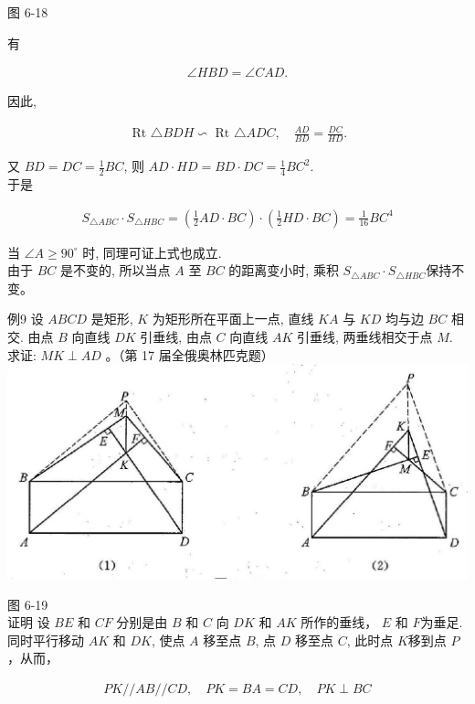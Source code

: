 \documentclass[10pt]{article}
\begin{document}
图 6-18

有

\begin{align*}
\angle H B D=\angle C A D .
\end{align*}

因此,

\begin{align*}
\text { Rt } \triangle B D H \backsim \text { Rt } \triangle A D C, \quad \frac{A D}{B D}=\frac{D C}{H D} .
\end{align*}

又 $B D=D C=\frac{1}{2} B C$, 则 $A D \cdot H D=B D \cdot D C=\frac{1}{4} B C^{2}$.\\
于是

\begin{align*}
S_{\triangle A B C} \cdot S_{\triangle H B C}=\left(\frac{1}{2} A D \cdot B C\right) \cdot\left(\frac{1}{2} H D \cdot B C\right)=\frac{1}{16} B C^{4}
\end{align*}

当 $\angle A \geqslant 90^{\circ}$ 时, 同理可证上式也成立.\\
由于 $B C$ 是不变的, 所以当点 $A$ 至 $B C$ 的距离变小时, 乘积 $S_{\triangle A B C} \cdot S_{\triangle H B C}$保持不变。

例9 设 $A B C D$ 是矩形, $K$ 为矩形所在平面上一点, 直线 $K A$ 与 $K D$ 均与边 $B C$ 相交. 由点 $B$ 向直线 $D K$ 引垂线, 由点 $C$ 向直线 $A K$ 引垂线, 两垂线相交于点 $M$. 求证: $M K \perp A D$ 。（第 17 届全俄奥林匹克题）\\
\includegraphics[max width=\textwidth, center]{2024_10_30_2c8f45efd4a519b08e1ag-070(1)}

图 6-19\\
证明 设 $B E$ 和 $C F$ 分别是由 $B$ 和 $C$ 向 $D K$ 和 $A K$ 所作的垂线， $E$ 和 $F$为垂足. 同时平行移动 $A K$ 和 $D K$, 使点 $A$ 移至点 $B$, 点 $D$ 移至点 $C$, 此时点 $K$移到点 $P$ ，从而，

\begin{align*}
P K / / A B / / C D, \quad P K=B A=C D, \quad P K \perp B C
\end{align*}
\end{document}
